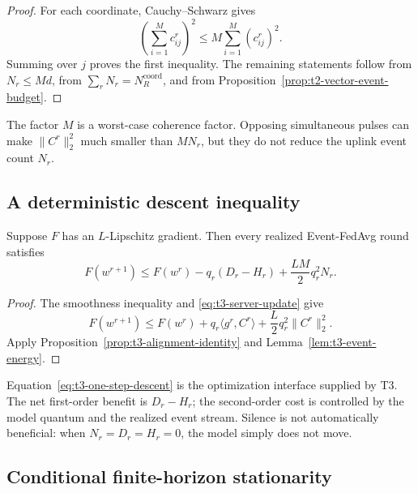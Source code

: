 \begin{proof}
For each coordinate, Cauchy--Schwarz gives
\begin{equation}
    \left(\sum_{i=1}^{M}c_{ij}^r\right)^2
    \leq M\sum_{i=1}^{M}(c_{ij}^r)^2.
\end{equation}
Summing over $j$ proves the first inequality.  The remaining statements follow
from $N_r\leq Md$, from
$\sum_rN_r=N_R^{\mathrm{coord}}$, and from
Proposition~\ref{prop:t2-vector-event-budget}.
\end{proof}

The factor $M$ is a worst-case coherence factor.  Opposing simultaneous pulses
can make $\|C^r\|_2^2$ much smaller than $MN_r$, but they do not reduce the
uplink event count $N_r$.

\subsection{A deterministic descent inequality}

\begin{proposition}
\label{prop:t3-one-step-descent}
Suppose $F$ has an $L$-Lipschitz gradient.  Then every realized Event-FedAvg
round satisfies
\begin{equation}
    F(w^{r+1})
    \leq
    F(w^r)
    -q_r(D_r-H_r)
    +\frac{LM}{2}q_r^2N_r.
    \label{eq:t3-one-step-descent}
\end{equation}
\end{proposition}

\begin{proof}
The smoothness inequality and \eqref{eq:t3-server-update} give
\begin{equation}
    F(w^{r+1})
    \leq
    F(w^r)
    +q_r\langle g^r,C^r\rangle
    +\frac{L}{2}q_r^2\|C^r\|_2^2.
\end{equation}
Apply Proposition~\ref{prop:t3-alignment-identity} and
Lemma~\ref{lem:t3-event-energy}.
\end{proof}

Equation~\eqref{eq:t3-one-step-descent} is the optimization interface supplied
by T3.  The net first-order benefit is $D_r-H_r$; the second-order cost is
controlled by the model quantum and the realized event stream.  Silence is not
automatically beneficial: when $N_r=D_r=H_r=0$, the model simply does not move.

\subsection{Conditional finite-horizon stationarity}

